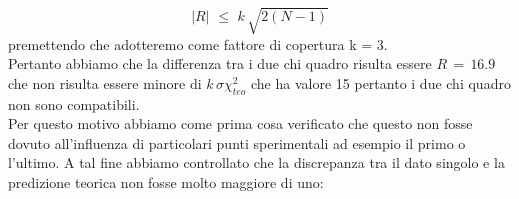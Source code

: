 \begin{equation*}
	|R| \,\, \leq \,\, k \, \sqrt{2(N - 1)}
\end{equation*}
%
premettendo che adotteremo come fattore di copertura k = 3.\\

Pertanto abbiamo che la differenza tra i due chi quadro risulta essere $R \,=\, 16.9$ che non risulta essere minore di $k \, \sigma \chi_{teo}^2$ che ha valore 15  pertanto i due chi quadro non sono compatibili.\\
Per questo motivo abbiamo come prima cosa verificato che questo non fosse dovuto all'influenza di particolari punti sperimentali ad esempio il primo o l'ultimo. A tal fine abbiamo controllato che la discrepanza tra il dato singolo e la predizione teorica non fosse molto maggiore di uno:

